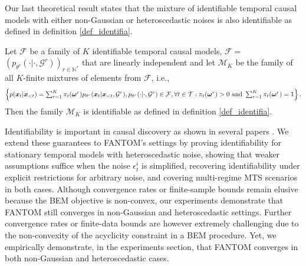 Our last theoretical result states that the mixture of identifiable temporal causal models with either non-Gaussian or heteroscedastic noises is also identifiable as defined in definition \ref{def_identifia}.
\begin{mybox}
\begin{theorem} Let $\mathcal{F}$ be a family of $K$ identifiable temporal causal models, $\mathcal{F}=$ $\left(p_{\theta^r}(\cdot| \cdot,\mathcal{G}^r)\right)_{r \in \mathbb{N}^*}$ that are linearly independent and let $\mathcal{M}_K$ be the family of all $K$-finite mixtures of elements from $\mathcal{F}$, i.e.,
\begin{equation*}
 \scalebox{0.87}{$
\left\{p(\boldsymbol{x}_t|\boldsymbol{x}_{<t}) =  \sum_{r=1}^K\pi_t(\boldsymbol{\omega}^r)p_{\theta^r}(\boldsymbol{x}_t|\boldsymbol{x}_{<t},\mathcal{G}^r), p_{\theta^r}(\cdot|\cdot, \mathcal{G}^r) \in \mathcal{F}, \forall t \in \mathcal{T}: \pi_t(\boldsymbol{\omega}^r)>0 \text{ and }\sum_{r=1}^K \pi_t(\boldsymbol{\omega}^r)=1\right\}
.$}   
\end{equation*}
Then the family $\mathcal{M}_K$ is identifiable as defined in definition \ref{def_identifia}.
\label{theo_DyTCM}
\end{theorem}
\end{mybox}
Identifiability is important in causal discovery as shown in several papers \citep{brouillard2020differentiable, 
gong2022rhino, pamfil2020dynotears,balsellsidentifiability}. We extend these guarantees to FANTOM's settings by proving identifiability for stationary temporal models with heteroscedastic noise, showing that weaker assumptions suffice when the noise $\epsilon_t^i$ is simplified, recovering identifiability under explicit restrictions for arbitrary noise, and covering multi-regime MTS scenarios in both cases. Although convergence rates or finite-sample bounds remain elusive because the BEM objective is non-convex, our experiments demonstrate that FANTOM still converges in non-Gaussian and heteroscedastic settings. Further convergence 
rates or finite-data bounds are however extremely challenging due 
to the non-convexity of the acyclicity constraint in a BEM procedure. Yet, we empirically demonstrate, in the experiments section, that FANTOM converges in both non-Gaussian and heteroscedastic cases.